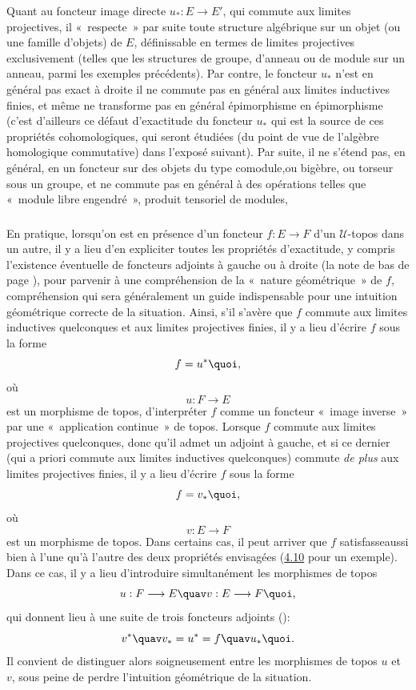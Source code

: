 \documentclass[10pt]{../fichiers-configuration-latex/smfart}
\begin{document}
Quant au foncteur image directe $u_{\ast}:E\rightarrow E'$, qui
commute aux limites projectives, il « respecte »  par suite
toute structure algébrique sur un objet (ou une famille d'objets)
de $E$, définissable en termes de limites projectives
exclusivement (telles que les structures de groupe, d'anneau ou de
module sur un anneau, parmi les exemples précédents). Par
contre, le foncteur $u_{\ast}$ n'est en général pas exact à
droite \ie il ne commute pas en général aux limites inductives
finies, et même ne transforme pas en général épimorphisme en
épimorphisme (c'est d'ailleurs ce défaut d'exactitude du
foncteur $u_{\ast}$ qui est la source de ces propriétés
cohomologiques, qui seront étudiées (du point de vue de
l'algèbre homologique commutative) dans l'exposé suivant). Par
suite, il ne s'étend pas, en général, en un foncteur sur des
objets du type comodule,\pageoriginale ou bigèbre, ou torseur sous
un groupe, et ne commute pas en général à des opérations
telles que « module libre engendré », produit tensoriel de
modules, \etc

\subsubsection{}
En pratique, lorsqu'on est en présence d'un foncteur
$f:E\rightarrow F$ d'un $𝒰$-topos dans un autre, il y a lieu
d'en expliciter toutes les propriétés d'exactitude, y compris
l'existence éventuelle de foncteurs adjoints à gauche ou à
droite (\cf la note de bas de page \pageref{sga4[1]}), pour parvenir
à une compréhension de la « nature géométrique »  de
$f$, compréhension qui sera généralement un guide
indispensable pour une intuition géométrique correcte de la
situation. Ainsi, s'il s'avère que $f$ commute aux limites
inductives quelconques et aux limites projectives finies, il y a
lieu d'écrire $f$ sous la forme
$$
f=u^{\ast}{\quoi},
$$
où
$$
u:F\longrightarrow E
$$
est un morphisme de topos, \ie d'interpréter $f$ comme un foncteur
« image inverse »  par une « application continue »  de
topos. Lorsque $f$ commute aux limites projectives quelconques, donc
qu'il admet un adjoint à gauche, et si ce dernier (qui a priori
commute aux limites inductives quelconques) commute \emph{de plus}
aux limites projectives finies, il y a lieu d'écrire $f$ sous la
forme
$$
f=v_{\ast}{\quoi},
$$
où
$$
v:E\longrightarrow F
$$
est un morphisme de topos. Dans certains cas, il peut arriver que
$f$ satisfasse\pageoriginale aussi bien à l'une qu'à l'autre des
deux propriétés envisagées (\cf \hyperref[IV.subsec4.10]{4.10} pour un
exemple). Dans ce cas, il y a lieu  d'introduire simultanément les
morphismes de topos
$$
u:F\longrightarrow E \quav v:E\longrightarrow F{\quoi},
$$
qui donnent lieu à une suite de trois foncteurs adjoints
():
$$
v^{\ast} \quav v_{\ast}=u^{\ast}=f\quav u_{\ast}{\quoi}.
$$
Il convient de distinguer alors soigneusement entre les morphismes
de topos $u$ et $v$, sous peine de perdre l'intuition
géométrique de la situation.
\end{document}
